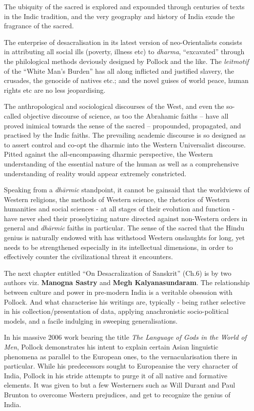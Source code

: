 The ubiquity of the sacred is explored and expounded through centuries of texts in the Indic tradition, and the very geography and history of India exude the fragrance of the sacred.

The enterprise of desacralisation in its latest version of neo-Orientalists consists in attributing all social ills (poverty, illness etc) to \textit{dharma}, “excavated” through the philological methods deviously designed by Pollock and the like. The \textit{leitmotif} of the “White Man’s Burden” has all along inflicted and justified slavery, the crusades, the genocide of natives etc.; and the novel guises of world peace, human rights etc are no less jeopardising.

The anthropological and sociological discourses of the West, and even the so-called objective discourse of science, as too the Abrahamic faiths – have all proved inimical towards the sense of the sacred – propounded, propagated, and practised by the Indic faiths. The prevailing academic discourse is so designed as to assert control and co-opt the dharmic into the Western Universalist discourse. Pitted against the all-encompassing dharmic perspective, the Western understanding of the essential nature of the human as well as a comprehensive understanding of reality would appear extremely constricted.

Speaking from a \textit{dhārmic} standpoint, it cannot be gainsaid that the worldviews of Western religions, the methods of Western science, the rhetorics of Western humanities and social sciences - at all stages of their evolution and function - have never shed their proselytizing nature directed against non-Western orders in general and \textit{dhārmic} faiths in particular. The sense of the sacred that the Hindu genius is naturally endowed with has withstood Western onslaughts for long, yet needs to be strengthened especially in its intellectual dimensions, in order to effectively counter the civilizational threat it encounters.

The next chapter entitled “On Desacralization of Sanskrit” (Ch.6) is by two authors viz. \textbf{Manogna Sastry} and \textbf{Megh Kalyanasundaram}. The relationship between culture and power in pre-modern India is a veritable obsession with Pollock. And what characterise his writings are, typically - being rather selective in his collection/presentation of data, applying anachronistic socio-political models, and a facile indulging in sweeping generalisations.

In his massive 2006 work bearing the title \textit{The Language of Gods in the World of Men}, Pollock demonstrates his intent to explain certain Asian linguistic phenomena as parallel to the European ones, to the vernacularisation there in particular. While his predecessors sought to Europeanise the very character of India, Pollock in his stride attempts to purge it of all native and formative elements. It was given to but a few Westerners such as Will Durant and Paul Brunton to overcome Western prejudices, and get to recognize the genius of India.

